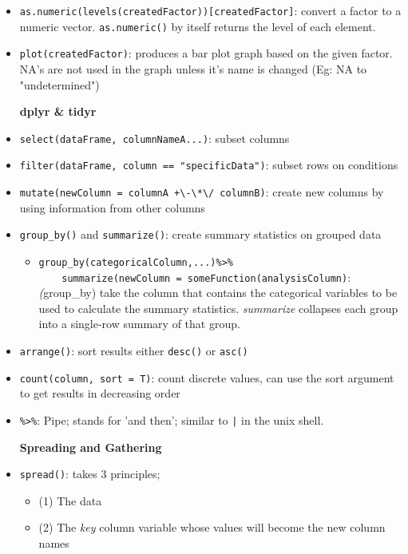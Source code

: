 \documentclass{article}
\begin{document}
\begin{itemize}
    \item \verb|as.numeric(levels(createdFactor))[createdFactor]|: convert a factor to a numeric vector. \verb|as.numeric()| by itself returns the level of each element.
    \item \verb|plot(createdFactor)|: produces a bar plot graph based on the given factor. NA's are not used in the graph unless it's name is changed (Eg: NA to "undetermined")
    \begin{center}
      \textbf{dplyr \& tidyr}  
    \end{center}
    \item \verb|select(dataFrame, columnNameA...)|: subset columns 
    \item \verb|filter(dataFrame, column == "specificData")|: subset rows on conditions 
    \item \verb|mutate(newColumn = columnA +\-\*\/ columnB)|: create new columns by using information from other columns 
    \item \verb|group_by()| and \verb|summarize()|: create summary statistics on grouped data
    \begin{itemize}
        \item \verb|group_by(categoricalColumn,...)%>%|\\
        \verb|    summarize(newColumn = someFunction(analysisColumn)|: \\
        \textit(group\_by) take the column that contains the categorical variables to be used to calculate the summary statistics. \textit{summarize} collapses each group into a single-row summary of that group.
    \end{itemize}
    \item \verb|arrange()|: sort results either \texttt{desc()} or \texttt{asc()} 
    \item \verb|count(column, sort = T)|: count discrete values, can use the sort argument to get results in decreasing order
    \item \verb|%>%|: Pipe; stands for 'and then'; similar to \texttt{|} in the unix shell.
    \begin{center}   
    \textbf{Spreading and Gathering}
    \end{center}
    \item \verb|spread()|: takes 3 principles;
    \begin{itemize}
        \item (1) The data
        \item (2) The \textit{key} column variable whose values will become the new column names

\end{itemize}
\end{itemize}
\end{document}
